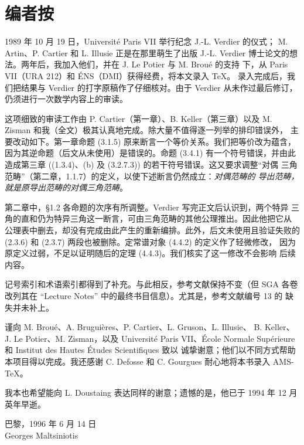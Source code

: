 \clearpage
{}
\chapter*{编者按}

1989 年 10 月 19 日，Université Paris VII 举行纪念 J.-L. Verdier 的仪式；
M. Artin、P. Cartier 和 L. Illusie 正是在那里萌生了出版 J.-L. Verdier
博士论文的想法。两年后，我加入他们，并在 J. Le Potier 与 M. Broué 的支持
下，从 Paris VII（URA 212）和 ÉNS（DMI）获得经费，将本文录入 \TeX{}。
录入完成后，我们把结果与 Verdier 的打字原稿作了仔细核对。由于 Verdier
从未作过最后修订，仍须进行一次数学内容上的审读。

这项细致的审读工作由 P. Cartier（第一章）、B. Keller（第三章）以及
M. Zisman 和我（全文）极其认真地完成。除大量不值得逐一列举的排印错误外，
主要改动如下。第一章命题 (3.1.5) 原来断言一个等价关系。我们把等价改为蕴含，
因为其逆命题（后文从未使用）是错误的。命题 (3.4.1) 有一个符号错误，并由此
造成第三章 ((1.3.4)、(b) 及 (3.2.7.3)) 的若干符号错误。这又要求调整“对偶
三角范畴”（第二章，1.1.7）的定义，以使下述断言仍然成立：\emph{对偶范畴的
导出范畴，就是原导出范畴的对偶三角范畴}。

第二章中，§1.2 各命题的次序有所调整。Verdier 写完正文后认识到，两个特异
三角的直和仍为特异三角这一断言，可由三角范畴的其他公理推出。因此他把它从
公理表中删去，却没有完成由此产生的重新编排。此外，后文未使用且验证失败的
(2.3.6) 和 (2.3.7) 两段也被删除。定常谱对象 (4.4.2) 的定义作了轻微修改，
因为原定义过弱，不足以证明随后的定理 (4.4.3)。我们核实了这一修改不会影响
后续内容。

\clearpage
{}
记号索引和术语索引都得到了补充。与此相反，参考文献保持不变（但 SGA 各卷
改列其在 ``Lecture Notes'' 中的最终书目信息）。尤其是，参考文献编号 13 的
缺失并未补上。

谨向 M. Broué、A. Bruguières、P. Cartier、L. Gruson、L. Illusie、
B. Keller、J. Le Potier、M. Zisman，以及 Université Paris VII、École
Normale Supérieure 和 Institut des Hautes Études Scientifiques 致以
诚挚谢意；他们以不同方式帮助本项目得以完成。我还感谢 C. Defosse 和
C. Gourgues 耐心地将本书录入 \textsc{AMS}-\TeX{}。

我本也希望能向 L. Doustaing 表达同样的谢意；遗憾的是，他已于 1994 年
12 月英年早逝。

\begin{flushright}
巴黎，1996 年 6 月 14 日\\
Georges Maltsiniotis
\end{flushright}
